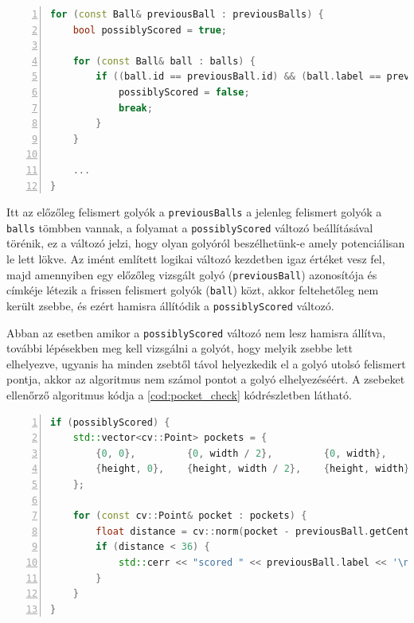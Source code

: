 \begin{codewrapper}
\begin{lstlisting}[language=C++, numbers=left, caption={Golyók potenciális lelökésének vizsgálata.}, label={cod:score_check}]
for (const Ball& previousBall : previousBalls) {
    bool possiblyScored = true;

    for (const Ball& ball : balls) {
        if ((ball.id == previousBall.id) && (ball.label == previousBall.label)) {
            possiblyScored = false;
            break;
        }
    }

    ...
}
\end{lstlisting}
\end{codewrapper}

\par Itt az előzőleg felismert golyók a \lstinline{previousBalls} a jelenleg felismert golyók a \lstinline{balls} tömbben vannak, a folyamat a \lstinline{possiblyScored} változó beállításával törénik, ez a változó jelzi, hogy olyan golyóról beszélhetünk-e amely potenciálisan le lett lökve. Az imént említett logikai változó kezdetben igaz értéket vesz fel, majd amennyiben egy előzőleg vizsgált golyó (\lstinline{previousBall}) azonosítója és címkéje létezik a frissen felismert golyók (\lstinline{ball}) közt, akkor feltehetőleg nem került zsebbe, és ezért hamisra állítódik a \lstinline{possiblyScored} változó.
\par Abban az esetben amikor a \lstinline{possiblyScored} változó nem lesz hamisra állítva, további lépésekben meg kell vizsgálni a golyót, hogy melyik zsebbe lett elhelyezve, ugyanis ha minden zsebtől távol helyezkedik el a golyó utolsó felismert pontja, akkor az algoritmus nem számol pontot a golyó elhelyezéséért. A zsebeket ellenőrző algoritmus kódja a \ref{cod:pocket_check} kódrészletben látható.

\begin{codewrapper}
\begin{lstlisting}[language=C++, numbers=left, caption={Potenciálisan lelökött golyó elhelyezett zsebének vizsgálata.}, label={cod:pocket_check}]
if (possiblyScored) {
    std::vector<cv::Point> pockets = {
        {0, 0},         {0, width / 2},         {0, width},
        {height, 0},    {height, width / 2},    {height, width}
    };

    for (const cv::Point& pocket : pockets) {
        float distance = cv::norm(pocket - previousBall.getCenter());
        if (distance < 36) {
            std::cerr << "scored " << previousBall.label << '\n';
        }
    }
}
\end{lstlisting}
\end{codewrapper}

